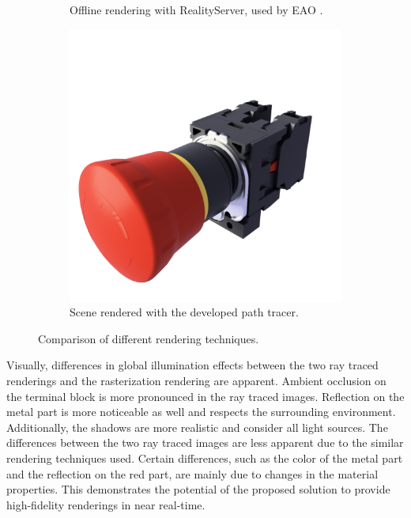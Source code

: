 \begin{figure}[H]
\begin{subfigure}[t]{0.3\textwidth}
    \caption{Offline rendering with \gls{RealityServer}, used by EAO \cite{eaoProductReference}.}
    \label{fig:offline-rendering}
  \end{subfigure}
  \hfill
  \begin{subfigure}[t]{0.3\textwidth}
      \includegraphics[width=\textwidth]{resources/comparison-strahl-rendering.png}
      \caption{Scene rendered with the developed path tracer.}
      \label{fig:strahl-rendering}
  \end{subfigure}
  \caption{Comparison of different rendering techniques.}
  \label{fig:final-rendering-comparison}
\end{figure}

Visually, differences in global illumination effects between the two ray traced renderings and the rasterization rendering are apparent. Ambient occlusion on the terminal block is more pronounced in the ray traced images. Reflection on the metal part is more noticeable as well and respects the surrounding environment. Additionally, the shadows are more realistic and consider all light sources. The differences between the two ray traced images are less apparent due to the similar rendering techniques used. Certain differences, such as the color of the metal part and the reflection on the red part, are mainly due to changes in the material properties. This demonstrates the potential of the proposed solution to provide high-fidelity renderings in near real-time.

